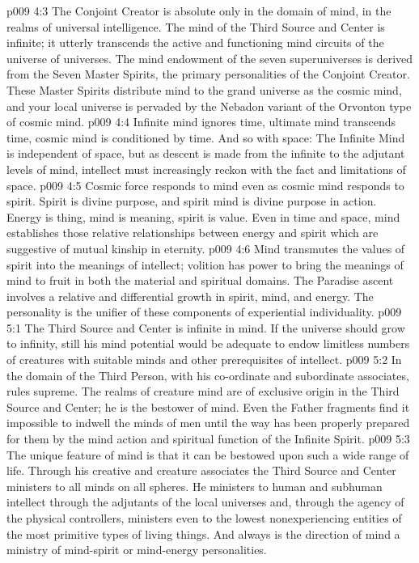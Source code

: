 \pc \vs p009 4:3 The Conjoint Creator is absolute only in the domain of mind, in the realms of universal intelligence. The mind of the Third Source and Center is infinite; it utterly transcends the active and functioning mind circuits of the universe of universes. The mind endowment of the seven superuniverses is derived from the Seven Master Spirits, the primary personalities of the Conjoint Creator. These Master Spirits distribute mind to the grand universe as the cosmic mind, and your local universe is pervaded by the Nebadon variant of the Orvonton type of cosmic mind.
\vs p009 4:4 Infinite mind ignores time, ultimate mind transcends time, cosmic mind is conditioned by time. And so with space: The Infinite Mind is independent of space, but as descent is made from the infinite to the adjutant levels of mind, intellect must increasingly reckon with the fact and limitations of space.
\pc \vs p009 4:5 Cosmic force responds to mind even as cosmic mind responds to spirit. Spirit is divine purpose, and spirit mind is divine purpose in action. Energy is thing, mind is meaning, spirit is value. Even in time and space, mind establishes those relative relationships between energy and spirit which are suggestive of mutual kinship in eternity.
\vs p009 4:6 Mind transmutes the values of spirit into the meanings of intellect; volition has power to bring the meanings of mind to fruit in both the material and spiritual domains. The Paradise ascent involves a relative and differential growth in spirit, mind, and energy. The personality is the unifier of these components of experiential individuality.
\vs p009 5:1 The Third Source and Center is infinite in mind. If the universe should grow to infinity, still his mind potential would be adequate to endow limitless numbers of creatures with suitable minds and other prerequisites of intellect.
\vs p009 5:2 In the domain of  the Third Person, with his co\hyp{}ordinate and subordinate associates, rules supreme. The realms of creature mind are of exclusive origin in the Third Source and Center; he is the bestower of mind. Even the Father fragments find it impossible to indwell the minds of men until the way has been properly prepared for them by the mind action and spiritual function of the Infinite Spirit.
\vs p009 5:3 The unique feature of mind is that it can be bestowed upon such a wide range of life. Through his creative and creature associates the Third Source and Center ministers to all minds on all spheres. He ministers to human and subhuman intellect through the adjutants of the local universes and, through the agency of the physical controllers, ministers even to the lowest nonexperiencing entities of the most primitive types of living things. And always is the direction of mind a ministry of mind\hyp{}spirit or mind\hyp{}energy personalities.
